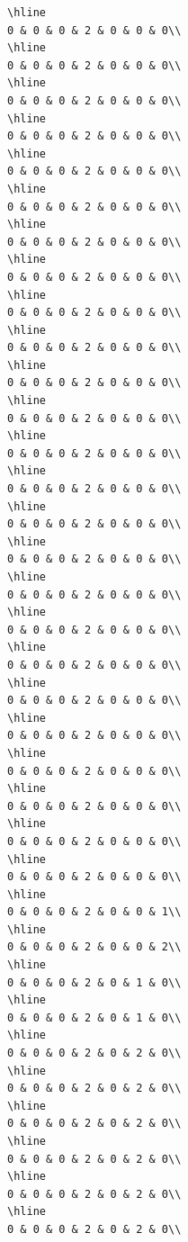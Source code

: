 \documentclass[
]{article}
\begin{document}
\begin{verbatim}
\hline
0 & 0 & 0 & 2 & 0 & 0 & 0\\
\hline
0 & 0 & 0 & 2 & 0 & 0 & 0\\
\hline
0 & 0 & 0 & 2 & 0 & 0 & 0\\
\hline
0 & 0 & 0 & 2 & 0 & 0 & 0\\
\hline
0 & 0 & 0 & 2 & 0 & 0 & 0\\
\hline
0 & 0 & 0 & 2 & 0 & 0 & 0\\
\hline
0 & 0 & 0 & 2 & 0 & 0 & 0\\
\hline
0 & 0 & 0 & 2 & 0 & 0 & 0\\
\hline
0 & 0 & 0 & 2 & 0 & 0 & 0\\
\hline
0 & 0 & 0 & 2 & 0 & 0 & 0\\
\hline
0 & 0 & 0 & 2 & 0 & 0 & 0\\
\hline
0 & 0 & 0 & 2 & 0 & 0 & 0\\
\hline
0 & 0 & 0 & 2 & 0 & 0 & 0\\
\hline
0 & 0 & 0 & 2 & 0 & 0 & 0\\
\hline
0 & 0 & 0 & 2 & 0 & 0 & 0\\
\hline
0 & 0 & 0 & 2 & 0 & 0 & 0\\
\hline
0 & 0 & 0 & 2 & 0 & 0 & 0\\
\hline
0 & 0 & 0 & 2 & 0 & 0 & 0\\
\hline
0 & 0 & 0 & 2 & 0 & 0 & 0\\
\hline
0 & 0 & 0 & 2 & 0 & 0 & 0\\
\hline
0 & 0 & 0 & 2 & 0 & 0 & 0\\
\hline
0 & 0 & 0 & 2 & 0 & 0 & 0\\
\hline
0 & 0 & 0 & 2 & 0 & 0 & 0\\
\hline
0 & 0 & 0 & 2 & 0 & 0 & 0\\
\hline
0 & 0 & 0 & 2 & 0 & 0 & 0\\
\hline
0 & 0 & 0 & 2 & 0 & 0 & 1\\
\hline
0 & 0 & 0 & 2 & 0 & 0 & 2\\
\hline
0 & 0 & 0 & 2 & 0 & 1 & 0\\
\hline
0 & 0 & 0 & 2 & 0 & 1 & 0\\
\hline
0 & 0 & 0 & 2 & 0 & 2 & 0\\
\hline
0 & 0 & 0 & 2 & 0 & 2 & 0\\
\hline
0 & 0 & 0 & 2 & 0 & 2 & 0\\
\hline
0 & 0 & 0 & 2 & 0 & 2 & 0\\
\hline
0 & 0 & 0 & 2 & 0 & 2 & 0\\
\hline
0 & 0 & 0 & 2 & 0 & 2 & 0\\

\end{verbatim}
\end{document}
